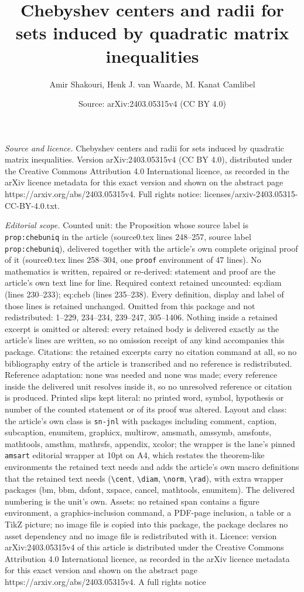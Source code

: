 \documentclass[10pt,a4paper]{amsart}
\title[Chebyshev centers and radii for sets induced by quadratic ma]{Chebyshev centers and radii for sets induced by quadratic matrix inequalities}
\author{Amir Shakouri, Henk J. van Waarde, M. Kanat Camlibel}
\date{Source: arXiv:2403.05315v4 (CC BY 4.0)}
\begin{document}
\maketitle

\noindent\emph{Source and licence.} Chebyshev centers and radii for sets induced by quadratic matrix inequalities. Version arXiv:2403.05315v4 (CC BY 4.0), distributed under the Creative Commons Attribution 4.0 International licence, as recorded in the arXiv licence metadata for this exact version and shown on the abstract page https://arxiv.org/abs/2403.05315v4. Full rights notice: licenses/arxiv-2403.05315-CC-BY-4.0.txt.\par\smallskip

\noindent\textit{Editorial scope.} Counted unit: the Proposition whose source label is \texttt{prop:chebuniq} in the article (source0.tex lines 248--257, source label \texttt{prop:chebuniq}), delivered together with the article's own complete original proof of it (source0.tex lines 258--304, one \texttt{proof} environment of 47 lines). No mathematics is written, repaired or re-derived: statement and proof are the article's own text line for line. Required context retained uncounted: eq:diam (lines 230--233); eq:cheb (lines 235--238). Every definition, display and label of those lines is retained unchanged. Omitted from this package and not redistributed: 1--229, 234--234, 239--247, 305--1406. Nothing inside a retained excerpt is omitted or altered: every retained body is delivered exactly as the article's lines are written, so no omission receipt of any kind accompanies this package. Citations: the retained excerpts carry no citation command at all, so no bibliography entry of the article is transcribed and no reference is redistributed. Reference adaptation: none was needed and none was made; every reference inside the delivered unit resolves inside it, so no unresolved reference or citation is produced. Printed slips kept literal: no printed word, symbol, hypothesis or number of the counted statement or of its proof was altered. Layout and class: the article's own class is \texttt{sn-jnl} with packages including comment, caption, subcaption, enumitem, graphicx, multirow, amsmath, amssymb, amsfonts, mathtools, amsthm, mathrsfs, appendix, xcolor; the wrapper is the lane's pinned \texttt{amsart} editorial wrapper at 10pt on A4, which restates the theorem-like environments the retained text needs and adds the article's own macro definitions that the retained text needs (\texttt{\textbackslash cent}, \texttt{\textbackslash diam}, \texttt{\textbackslash norm}, \texttt{\textbackslash rad}), with extra wrapper packages (bm, bbm, dsfont, xspace, cancel, mathtools, enumitem). The delivered numbering is the unit's own. Assets: no retained span contains a figure environment, a graphics-inclusion command, a PDF-page inclusion, a table or a TikZ picture; no image file is copied into this package, the package declares no asset dependency and no image file is redistributed with it. Licence: version arXiv:2403.05315v4 of this article is distributed under the Creative Commons Attribution 4.0 International licence, as recorded in the arXiv licence metadata for this exact version and shown on the abstract page https://arxiv.org/abs/2403.05315v4. A full rights notice 
\end{document}
